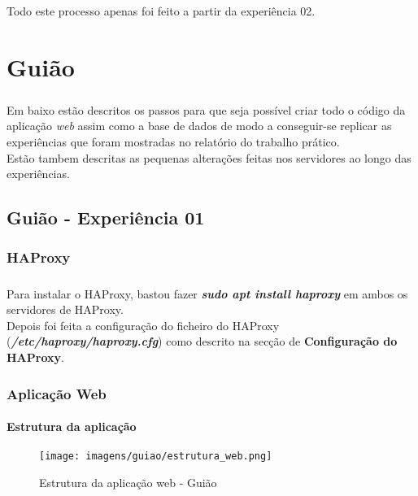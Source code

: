 \documentclass{report}
\begin{document}
\paragraph{}
Todo este processo apenas foi feito a partir da experiência 02.


\chapter{Guião}\label{Guião}
\paragraph{}
Em baixo estão descritos os passos para que seja possível criar todo o código da aplicação \emph{web} assim como a base de dados de modo a conseguir-se replicar as experiências que foram mostradas no relatório do trabalho prático.\\
Estão tambem descritas as pequenas alterações feitas nos servidores ao longo das experiências.

\section{Guião - Experiência 01}

\subsection{HAProxy}
\paragraph{}
Para instalar o HAProxy, bastou fazer \textbf{\emph{sudo apt install haproxy}} em ambos os servidores de HAProxy.\\
Depois foi feita a configuração do ficheiro do HAProxy (\textbf{\emph{/etc/haproxy/haproxy.cfg}}) como descrito na secção de \textbf{Configuração do HAProxy}.

\subsection{Aplicação Web}
\subsubsection{Estrutura da aplicação}

\begin{figure}[H]
\center
\texttt{[image: imagens/guiao/estrutura\_web.png]}
\caption{Estrutura da aplicação web - Guião}
\label{fig.nav}
\end{figure}
\end{document}
